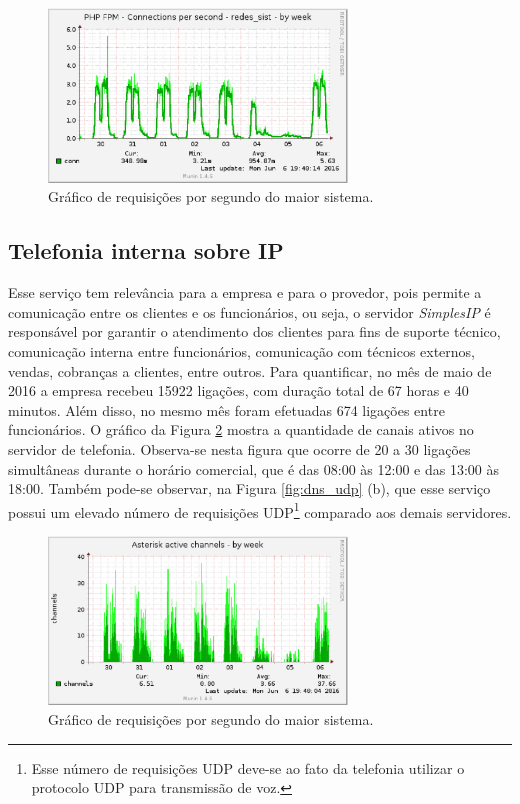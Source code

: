 
\begin{figure}[h!]
 \centering
 \includegraphics[width=300px]{img/soldi_week.eps}
 \caption{Gráfico de requisições por segundo do maior sistema.}
 \label{fig:soldi_week}
\end{figure}

\subsection{Telefonia interna sobre IP}
\label{section:telefonia}

Esse serviço tem relevância para a empresa e para o provedor, pois permite a comunicação entre os clientes e os funcionários, ou seja, o 
servidor \textit{SimplesIP} é responsável por garantir o atendimento dos clientes para fins de suporte técnico, comunicação interna entre 
funcionários, comunicação com técnicos externos, vendas, cobranças a clientes, entre outros. Para quantificar, no mês de maio de 2016 a empresa 
recebeu 15922 ligações, com duração total de 67 horas e 40 minutos. Além disso, no mesmo mês foram efetuadas 674 ligações entre funcionários. 
O gráfico da Figura \ref{fig:simplesip_week} mostra a quantidade de canais ativos no servidor de telefonia. Observa-se nesta figura que ocorre 
de 20 a 30 ligações simultâneas durante o horário comercial, que é das 08:00 às 12:00 e das 13:00 às 18:00. Também pode-se observar, na Figura 
\ref{fig:dns_udp} (b), que esse serviço possui um elevado número de requisições \ac{UDP}\footnote[1]{Esse número de requisições \ac{UDP} 
deve-se ao fato da telefonia utilizar o protocolo \ac{UDP} para transmissão de voz.} comparado aos demais servidores.

\begin{figure}[h!]
 \centering
 \includegraphics[width=300px]{img/simplesip_week.eps}
 \caption{Gráfico de requisições por segundo do maior sistema.}
 \label{fig:simplesip_week}
\end{figure}

